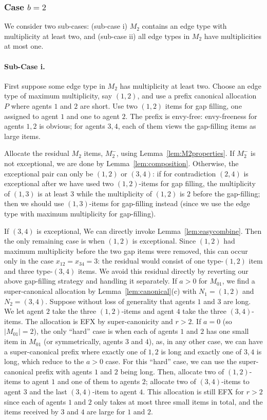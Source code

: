 \documentclass{article}
\theoremstyle{definition}
\begin{document}
\subsubsection{Case $b=2$}
We consider two sub-cases: (sub-case i) $M_2$ contains an edge type with multiplicity at least two, and (sub-case ii) all edge types in $M_2$ have multiplicities at most one.

\paragraph{Sub-Case i.} First suppose some edge type in $M_2$ has multiplicity at least two.  Choose
an edge type of maximum multiplicity, say $(1,2)$, and use a prefix canonical allocation $P$ where agents $1$ and $2$ are short.
Use two $(1,2)$ items for gap filling, one assigned to agent $1$ and one to agent $2$.  The prefix is envy-free: 
envy-freeness for agents $1,2$ is obvious;
for agents $3,4$, each of them views the gap-filling items as large items.

Allocate the residual $M_2$ items, $M_2^-$, using Lemma~\ref{lem:M2properties}.  
If $M_2^-$ is not exceptional, we are done by Lemma~\ref{lem:composition}.
Otherwise, the exceptional pair can only be $(1,2)$ or $(3,4)$: if for contradiction $(2,4)$ is exceptional after we have used two $(1,2)$-items for gap filling, the multiplicity of $(1,3)$ is at least $3$ while the multiplicity of $(1,2)$ is $2$ before the gap-filling; then we should use $(1,3)$-items for gap-filling instead (since we use the edge type with maximum multiplicity for gap-filling).  

If $(3,4)$ is exceptional, We can directly invoke Lemma~\ref{lem:easycombine}.
Then the only remaining case is when $(1,2)$ is exceptional. 
Since $(1,2)$ had maximum multiplicity before the two gap items were removed, this can occur only in the case $x_{12}=x_{34}=3$: the residual would consist of one type-$(1,2)$ item and three type-$(3,4)$ items.  
We avoid this residual directly by reverting our above gap-filling strategy and handling it separately.  
If $a>0$ for $M_{01}$, we find a super-canonical allocation by Lemma~\ref{lem:canonical}(c) with $N_1=(1,2)$ and $N_2=(3,4)$.
Suppose without loss of generality that agents $1$ and $3$ are long.
We let agent $2$ take the three $(1,2)$-items and agent $4$ take the three $(3,4)$-items.
The allocation is EFX by super-canonicity and $r>2$.
If $a=0$ (so $|M_{01}|=2$), the only ``hard'' case is when each of agents $1$ and $2$ has one small item in $M_{01}$ (or symmetrically, agents $3$ and $4$), as, in any other case, we can have a super-canonical prefix where exactly one of $1,2$ is long and exactly one of $3,4$ is long, which reduce to the $a>0$ case.
For this ``hard'' case, we can use the super-canonical prefix with agents $1$ and $2$ being long.
Then, allocate two of $(1,2)$-items to agent $1$ and one of them to agents $2$; allocate two of $(3,4)$-items to agent $3$ and the last $(3,4)$-item to agent $4$.
This allocation is still EFX for $r>2$ since each of agents $1$ and $2$ only takes at most three small items in total, and the items received by $3$ and $4$ are large for $1$ and $2$.
\end{document}
